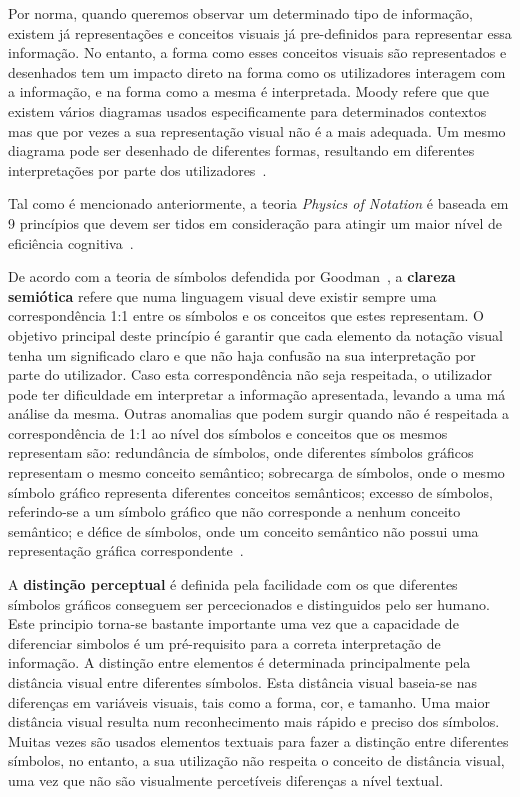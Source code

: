 Por norma, quando queremos observar um determinado tipo de informação, existem já representações e conceitos visuais já pre-definidos para representar essa informação. No entanto, a forma como esses conceitos visuais são representados e desenhados tem um impacto direto na forma como os utilizadores interagem com a informação, e na forma como a mesma é interpretada. Moody refere que que existem vários diagramas usados especificamente para determinados contextos mas que por vezes a sua representação visual não é a mais adequada. Um mesmo diagrama pode ser desenhado de diferentes formas, resultando em diferentes interpretações por parte dos utilizadores~\cite{moody2009physics}. 

Tal como é mencionado anteriormente, a teoria \textit{Physics of Notation} é baseada em 9 princípios que devem ser tidos em consideração para atingir um maior nível de eficiência cognitiva~\cite{moody2009physics}.

De acordo com a teoria de símbolos defendida por Goodman~\cite{goodman1976languages}, a \textbf{clareza semiótica} refere que numa linguagem visual deve existir sempre uma correspondência 1:1 entre os símbolos e os conceitos que estes representam. O objetivo principal deste princípio é garantir que cada elemento da notação visual tenha um significado claro e que não haja confusão na sua interpretação por parte do utilizador. Caso esta correspondência não seja respeitada, o utilizador pode ter dificuldade em interpretar a informação apresentada, levando a uma má análise da mesma. Outras anomalias que podem surgir quando não é respeitada a correspondência de 1:1 ao nível dos símbolos e conceitos que os mesmos representam são: redundância de símbolos, onde diferentes símbolos gráficos representam o mesmo conceito semântico; sobrecarga de símbolos, onde o mesmo símbolo gráfico representa diferentes conceitos semânticos; excesso de símbolos, referindo-se a um símbolo gráfico que não corresponde a nenhum conceito semântico; e défice de símbolos, onde um conceito semântico não possui uma representação gráfica correspondente~\cite{moody2009physics}.

A \textbf{distinção perceptual} é definida pela facilidade com os que diferentes símbolos gráficos conseguem ser percecionados e distinguidos pelo ser humano. Este principio torna-se bastante importante uma vez que a capacidade de diferenciar simbolos é um pré-requisito para a correta interpretação de informação. A distinção entre elementos é determinada principalmente pela distância visual entre diferentes símbolos. Esta distância visual baseia-se nas diferenças em variáveis visuais, tais como a forma, cor, e tamanho. Uma maior distância visual resulta num reconhecimento mais rápido e preciso dos símbolos. Muitas vezes são usados elementos textuais para fazer a distinção entre diferentes símbolos, no entanto, a sua utilização não respeita o conceito de distância visual, uma vez que não são visualmente percetíveis diferenças a nível textual.

